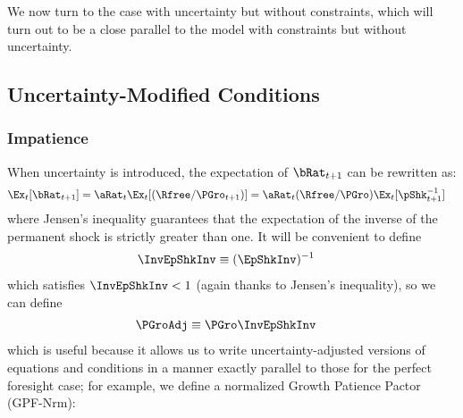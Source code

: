 \documentclass[BufferStockTheory]{subfiles}
\begin{document}
We now turn to the case with uncertainty but without constraints, which will turn out to be a close parallel to the model with constraints but without uncertainty.

\hypertarget{Uncertainty-Modified-Conditions}{}
\subsection{Uncertainty-Modified Conditions}\label{subsec:UncertaintyModifiedConditions}
\subsubsection{Impatience}

When uncertainty is introduced, the expectation of $\bRat_{t+1}$ can be rewritten as:  
\begin{align}
  \Ex_{t}[\bRat_{t+1}]  & =  \aRat_{t}\Ex_{t}[(\Rfree/\PGro_{t+1})] = \aRat_{t}(\Rfree/\PGro)\Ex_{t}[\pShk_{t+1}^{-1}] \label{eq:EbRat}
\end{align}
where Jensen's inequality guarantees that the expectation of the inverse of the permanent shock is strictly greater than one.  It will be convenient to define\hypertarget{InvEpShkInv}{}
\begin{align}
  \InvEpShkInv  & \equiv  (\EpShkInv)^{-1} \label{eq:InvEpShkInv}
\end{align}
which satisfies $\InvEpShkInv < 1$ (again thanks to Jensen's inequality), so we can define
\begin{align}
      \PGroAdj & \equiv \PGro \InvEpShkInv \label{eq:PGroAdj}
\end{align}
which is useful because it allows us to write uncertainty-adjusted versions of equations and conditions in a manner exactly parallel to those for the perfect foresight case; for example, we define a normalized Growth Patience Pactor (GPF-Nrm):
\hypertarget{GICNrm}{}
\hypertarget{GICNrmI}{}
\hypertarget{PGroAdj}{}
\end{document}
